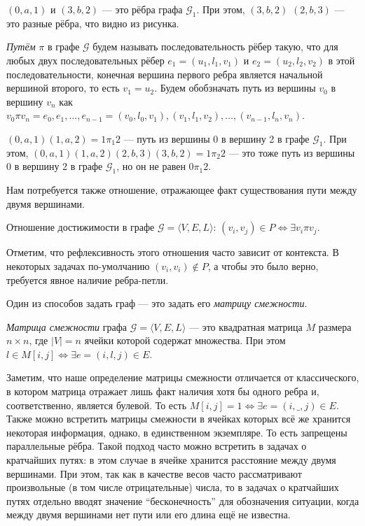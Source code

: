\begin{example}
$(0,a,1)$  и $(3,b,2)$ --- это рёбра графа $\mathcal{G}_1$.%
При этом, $(3,b,2)$ $(2,b,3)$ --- это разные рёбра, что видно из рисунка.
\end{example}

\begin{definition}
  \textit{Путём} $\pi$ в графе $\mathcal{G}$ будем называть последовательность рёбер такую, что для любых двух последовательных рёбер $e_1=(u_1,l_1,v_1)$ и $e_2=(u_2,l_2,v_2)$ в этой последовательности, конечная вершина первого ребра является начальной вершиной второго, то есть $v_1 = u_2$.
  Будем обобзначать путь из вершины $v_0$ в вершину $v_n$ как $v_0 \pi v_n = e_0,e_1, \dots, e_{n-1} = (v_0, l_0, v_1),(v_1,l_1,v_2),\dots,(v_{n-1},l_n,v_n)$.
\end{definition}


\begin{example}
$(0,a,1)(1,a,2) = 1\pi_1 2$  --- путь из вершины 0 в вершину 2 в графе $\mathcal{G}_1$.
При этом, $(0,a,1)(1,a,2)(2,b,3)(3,b,2) = 1\pi_2 2$ --- это тоже путь из вершины 0 в вершину 2 в графе $\mathcal{G}_1$, но он не равен $0\pi_1 2$.
\end{example}


Нам потребуется также отношение, отражающее факт существования пути между двумя вершинами.

\begin{definition}\label{def:reach}
  Отношение достижимости в графе $\mathcal{G} = \langle V, E, L \rangle$: $(v_i,v_j) \in P \iff \exists v_i \pi v_j$.
\end{definition}

Отметим, что рефлексивность этого отношения часто зависит от контекста.
В некоторых задачах по-умолчанию $(v_i,v_i) \notin P$, а чтобы это было верно, требуется явное наличие ребра-петли.

Один из способов задать граф --- это задать его \textit{матрицу смежности}.

\begin{definition}
  \textit{Матрица смежности} графа $\mathcal{G}=\langle V,E,L \rangle$ --- это квадратная матрица $M$ размера $n \times n$, где $|V| = n$ ячейки которой содержат множества.
  При этом $l \in M[i,j] \iff \exists e = (i,l,j) \in E$.
\end{definition}

Заметим, что наше определение матрицы смежности отличается от классического, в котором матрица отражает лишь факт наличия хотя бы одного ребра и, соответственно, является булевой.
То есть $M[i,j] = 1 \iff \exists e = (i,\_,j) \in E$.
Также можно встретить матрицы смежности в ячейках которых всё же хранится некоторая информация, однако, в единственном экземпляре.
То есть запрещены параллельные рёбра.
Такой подход часто можно встретить в задачах о кратчайших путях: в этом случае в ячейке хранится расстояние между двумя вершинами.
При этом, так как в качестве весов часто рассматривают произвольные (в том числе отрицательные) числа, то в задачах о кратчайших путях отдельно вводят значение ``бесконечность'' для обозначения ситуации, когда между двумя вершинами нет пути или его длина ещё не известна.

